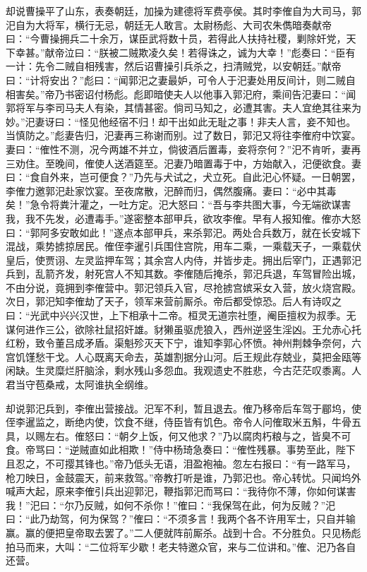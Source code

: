 却说曹操平了山东，表奏朝廷，加操为建德将军费亭侯。其时李傕自为大司马，郭汜自为大将军，横行无忌，朝廷无人敢言。太尉杨彪、大司农朱儁暗奏献帝曰：“今曹操拥兵二十余万，谋臣武将数十员，若得此人扶持社稷，剿除奸党，天下幸甚。”献帝泣曰：“朕被二贼欺凌久矣！若得诛之，诚为大幸！”彪奏曰：“臣有一计：先令二贼自相残害，然后诏曹操引兵杀之，扫清贼党，以安朝廷。”献帝曰：“计将安出？”彪曰：“闻郭汜之妻最妒，可令人于汜妻处用反间计，则二贼自相害矣。”帝乃书密诏付杨彪。彪即暗使夫人以他事入郭汜府，乘间告汜妻曰：“闻郭将军与李司马夫人有染，其情甚密。倘司马知之，必遭其害。夫人宜绝其往来为妙。”汜妻讶曰：“怪见他经宿不归！却干出如此无耻之事！非夫人言，妾不知也。当慎防之。”彪妻告归，汜妻再三称谢而别。过了数日，郭汜又将往李傕府中饮宴。妻曰：“傕性不测，况今两雄不并立，倘彼酒后置毒，妾将奈何？”汜不肯听，妻再三劝住。至晚间，傕使人送酒筵至。汜妻乃暗置毒于中，方始献入，汜便欲食。妻曰：“食自外来，岂可便食？”乃先与犬试之，犬立死。自此汜心怀疑。一日朝罢，李傕力邀郭汜赴家饮宴。至夜席散，汜醉而归，偶然腹痛。妻曰：“必中其毒矣！”急令将粪汁灌之，一吐方定。汜大怒曰：“吾与李共图大事，今无端欲谋害我，我不先发，必遭毒手。”遂密整本部甲兵，欲攻李傕。早有人报知傕。傕亦大怒曰：“郭阿多安敢如此！”遂点本部甲兵，来杀郭汜。两处合兵数万，就在长安城下混战，乘势掳掠居民。傕侄李暹引兵围住宫院，用车二乘，一乘载天子，一乘载伏皇后，使贾诩、左灵监押车驾；其余宫人内侍，并皆步走。拥出后宰门，正遇郭汜兵到，乱箭齐发，射死宫人不知其数。李傕随后掩杀，郭汜兵退，车驾冒险出城，不由分说，竟拥到李傕营中。郭汜领兵入官，尽抢掳宫嫔采女入营，放火烧宫殿。次日，郭汜知李傕劫了天子，领军来营前厮杀。帝后都受惊恐。后人有诗叹之曰：“光武中兴兴汉世，上下相承十二帝。桓灵无道宗社堕，阉臣擅权为叔季。无谋何进作三公，欲除社鼠招奸雄。豺獭虽驱虎狼入，西州逆竖生淫凶。王允赤心托红粉，致令董吕成矛盾。渠魁殄灭天下宁，谁知李郭心怀愤。神州荆棘争奈何，六宫饥馑愁干戈。人心既离天命去，英雄割据分山河。后王规此存兢业，莫把金瓯等闲缺。生灵糜烂肝脑涂，剩水残山多怨血。我观遗史不胜悲，今古茫茫叹黍离。人君当守苞桑戒，太阿谁执全纲维。

却说郭汜兵到，李傕出营接战。汜军不利，暂且退去。傕乃移帝后车驾于郿坞，使侄李暹监之，断绝内使，饮食不继，侍臣皆有饥色。帝令人问傕取米五斛，牛骨五具，以赐左右。傕怒曰：“朝夕上饭，何又他求？”乃以腐肉朽粮与之，皆臭不可食。帝骂曰：“逆贼直如此相欺！”侍中杨琦急奏曰：“傕性残暴。事势至此，陛下且忍之，不可撄其锋也。”帝乃低头无语，泪盈袍袖。忽左右报曰：“有一路军马，枪刀映日，金鼓震天，前来救驾。”帝教打听是谁，乃郭汜也。帝心转忧。只闻坞外喊声大起，原来李傕引兵出迎郭汜，鞭指郭汜而骂曰：“我待你不薄，你如何谋害我！”汜曰：“尔乃反贼，如何不杀你！”傕曰：“我保驾在此，何为反贼？”汜曰：“此乃劫驾，何为保驾？”傕曰：“不须多言！我两个各不许用军士，只自并输赢。赢的便把皇帝取去罢了。”二人便就阵前厮杀。战到十合。不分胜负。只见杨彪拍马而来，大叫：“二位将军少歇！老夫特邀众官，来与二位讲和。”傕、汜乃各自还营。

